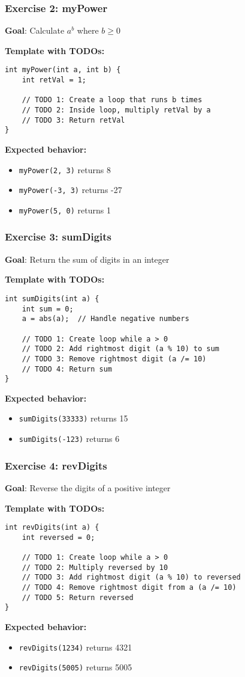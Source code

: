 \documentclass{beamer}
\begin{document}
\begin{frame}[fragile]
\frametitle{Exercise 2: myPower}
\textbf{Goal}: Calculate $a^b$ where $b \geq 0$\pause

\textbf{Template with TODOs:}
\begin{verbatim}
int myPower(int a, int b) {
    int retVal = 1;
    
    // TODO 1: Create a loop that runs b times
    // TODO 2: Inside loop, multiply retVal by a
    // TODO 3: Return retVal
}
\end{verbatim}
\pause

\textbf{Expected behavior:}
\begin{itemize}
    \item \texttt{myPower(2, 3)} returns 8
    \item \texttt{myPower(-3, 3)} returns -27
    \item \texttt{myPower(5, 0)} returns 1
\end{itemize}
\end{frame}

\begin{frame}[fragile]
\frametitle{Exercise 3: sumDigits}
\textbf{Goal}: Return the sum of digits in an integer\pause

\textbf{Template with TODOs:}
\begin{verbatim}
int sumDigits(int a) {
    int sum = 0;
    a = abs(a);  // Handle negative numbers
    
    // TODO 1: Create loop while a > 0
    // TODO 2: Add rightmost digit (a % 10) to sum
    // TODO 3: Remove rightmost digit (a /= 10)
    // TODO 4: Return sum
}
\end{verbatim}
\pause

\textbf{Expected behavior:}
\begin{itemize}
    \item \texttt{sumDigits(33333)} returns 15
    \item \texttt{sumDigits(-123)} returns 6
\end{itemize}
\end{frame}

\begin{frame}[fragile]
\frametitle{Exercise 4: revDigits}
\textbf{Goal}: Reverse the digits of a positive integer\pause

\textbf{Template with TODOs:}
\begin{verbatim}
int revDigits(int a) {
    int reversed = 0;
    
    // TODO 1: Create loop while a > 0
    // TODO 2: Multiply reversed by 10
    // TODO 3: Add rightmost digit (a % 10) to reversed
    // TODO 4: Remove rightmost digit from a (a /= 10)
    // TODO 5: Return reversed
}
\end{verbatim}
\pause

\textbf{Expected behavior:}
\begin{itemize}
    \item \texttt{revDigits(1234)} returns 4321
    \item \texttt{revDigits(5005)} returns 5005
\end{itemize}
\end{frame}
\end{document}

